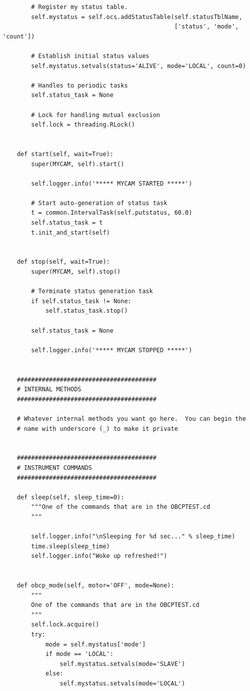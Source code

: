 \documentclass[11pt]{report}
\begin{document}
\begin{verbatim}
        # Register my status table.
        self.mystatus = self.ocs.addStatusTable(self.statusTblName,
                                                ['status', 'mode', 'count'])
        
        # Establish initial status values
        self.mystatus.setvals(status='ALIVE', mode='LOCAL', count=0)

        # Handles to periodic tasks
        self.status_task = None

        # Lock for handling mutual exclusion
        self.lock = threading.RLock()


    def start(self, wait=True):
        super(MYCAM, self).start()
        
        self.logger.info('***** MYCAM STARTED *****')

        # Start auto-generation of status task
        t = common.IntervalTask(self.putstatus, 60.0)
        self.status_task = t
        t.init_and_start(self)


    def stop(self, wait=True):
        super(MYCAM, self).stop()
        
        # Terminate status generation task
        if self.status_task != None:
            self.status_task.stop()

        self.status_task = None

        self.logger.info('***** MYCAM STOPPED *****')


    #######################################
    # INTERNAL METHODS
    #######################################

    # Whatever internal methods you want go here.  You can begin the
    # name with underscore (_) to make it private


    #######################################
    # INSTRUMENT COMMANDS
    #######################################

    def sleep(self, sleep_time=0):
        """One of the commands that are in the OBCPTEST.cd
        """

        self.logger.info("\nSleeping for %d sec..." % sleep_time)
        time.sleep(sleep_time)
        self.logger.info("Woke up refreshed!")


    def obcp_mode(self, motor='OFF', mode=None):
        """
        One of the commands that are in the OBCPTEST.cd
        """
        self.lock.acquire()
        try:
            mode = self.mystatus['mode']
            if mode == 'LOCAL':
                self.mystatus.setvals(mode='SLAVE')
            else:
                self.mystatus.setvals(mode='LOCAL')


\end{verbatim}
\end{document}
